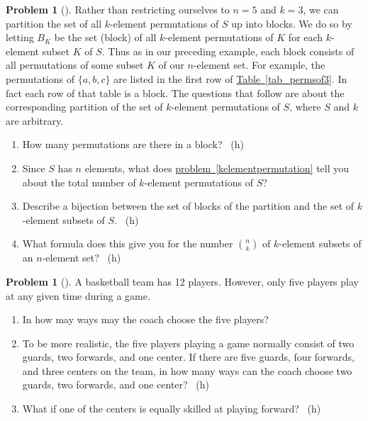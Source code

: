 \documentclass[10pt,]{book}
\theoremstyle{plain}
\theoremstyle{definition}
\newtheorem{activity}[project]{Problem}
\theoremstyle{definition}
\numberwithin{equation}{chapter}
\newcommand{\importantarrow}{\Rightarrow}
\begin{document}
\begin{activity}[] \label{formulanchoosek}
\hypertarget{p-222}{}%
Rather than restricting ourselves to \(n=5\) and \(k=3\), we can partition the set of all \(k\)-element permutations of \(S\) up into blocks. We do so by letting \(B_K\) be the set (block) of all \(k\)-element permutations of \(K\) for each \(k\)-element subset \(K\) of \(S\). Thus as in our preceding example, each block consists of all permutations of some subset \(K\) of our \(n\)-element set. For example, the permutations of \(\{a,b,c\}\) are listed in the first row of \hyperref[tab_permsof3]{Table~\ref{tab_permsof3}}. In fact each row of that table is a block. The questions that follow are about the corresponding partition of the set of \(k\)-element permutations of \(S\), where \(S\) and \(k\) are arbitrary.%
\begin{enumerate}[font=\bfseries,label=(\alph*),ref=\alph*]
\item\label{task-38} \marginsymbol[-2.5em]{} \hypertarget{p-223}{}%
How many permutations are there in a block?%
~{\tiny (h)}\item\label{task-39} \marginsymbol[-2.5em]{} \hypertarget{p-226}{}%
Since \(S\) has \(n\) elements, what does \hyperref[kelementpermutation]{problem~\ref{kelementpermutation}} tell you about the total number of \(k\)-element permutations of \(S\)?%
\item\label{task-40} \marginsymbol[-2.5em]{} \hypertarget{p-228}{}%
Describe a bijection between the set of blocks of the partition and the set of \(k\)-element subsets of \(S\).%
~{\tiny (h)}\item\label{formulanchoosekfinal} \marginsymbol[-2.5em]{} \hypertarget{p-231}{}%
What formula does this give you for the number \(\binom{n}{k}\) of \(k\)-element subsets of an \(n\)-element set?%
~{\tiny (h)}\end{enumerate}
\end{activity}
\begin{activity}[]\marginsymbol[-1em]{\pdftooltip{$\importantarrow$}{especially interesting}} \label{activity-40}
\hypertarget{p-234}{}%
A basketball team has 12 players. However, only five players play at any given time during a game.%
\begin{enumerate}[font=\bfseries,label=(\alph*),ref=\alph*]
\item\label{task-42} \marginsymbol[-2.5em]{} \hypertarget{p-235}{}%
In how may ways may the coach choose the five players?%
\item\label{task-43} \marginsymbol[-2.5em]{} \hypertarget{p-237}{}%
To be more realistic, the five players playing a game normally consist of two guards, two forwards, and one center.  If there are five guards, four forwards, and three centers on the team, in how many ways can the coach choose two guards, two forwards, and one center?%
~{\tiny (h)}\item\label{task-44} \marginsymbol[-2.5em]{} \hypertarget{p-240}{}%
What if one of the centers is equally skilled at playing forward?%
~{\tiny (h)}\end{enumerate}
\end{activity}
\end{document}
